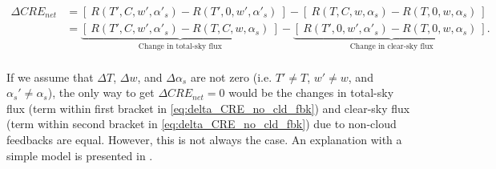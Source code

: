 \begin{equation}
    \begin{aligned}
        \Delta {CRE}_{net} &= \left[~{R}(T', C, w', \alpha'_s)  - {R}(T', 0, w', \alpha'_s) ~\right] - 
        \left[~{R}(T, C, w, \alpha_s) - {R}(T, 0, w, \alpha_s) ~\right] \\
         & = \underbrace{\left[~{R}(T', C, w', \alpha'_s)  - {R}(T, C, w, \alpha_s)  ~\right]}_\text{Change in total-sky flux} - \underbrace{\left[~ {R}(T', 0, w', \alpha'_s) - {R}(T, 0, w, \alpha_s) ~\right].}_\text{Change in clear-sky flux} \\
    \end{aligned}
    \label{eq:delta_CRE_no_cld_fbk}
\end{equation}


If we assume that $\Delta T$, $\Delta w$, and  $\Delta \alpha_s$ are not zero (i.e. $T'\neq T$,  $w'\neq w$, and  $\alpha_s'\neq \alpha_s$), the only way to get $\Delta {CRE}_{net}=0$ would be the changes in total-sky flux (term within first bracket in \eqref{eq:delta_CRE_no_cld_fbk}) and clear-sky flux (term within second bracket in \eqref{eq:delta_CRE_no_cld_fbk}) due to non-cloud feedbacks are equal. However, this is not always the case. An explanation with a simple model is presented in . %


